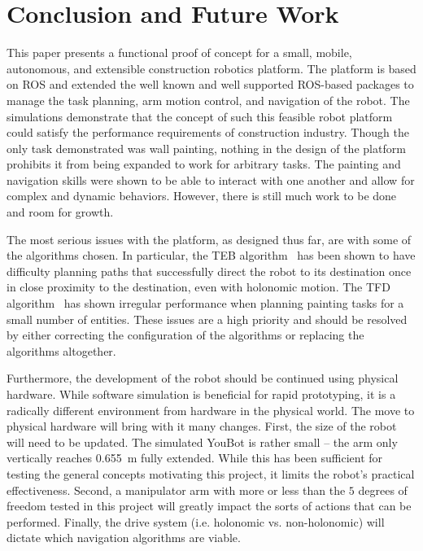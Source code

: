 \section{Conclusion and Future Work} \label{sec:conclusion}
This paper presents a functional proof of concept for a small, mobile, autonomous, and extensible construction robotics platform. The platform is based on ROS and extended the well known and well supported ROS-based packages to manage the task planning, arm motion control, and navigation of the robot. The simulations demonstrate that the concept of such this feasible robot platform could satisfy the performance requirements of construction industry. Though the only task demonstrated was wall painting, nothing in the design of the platform prohibits it from being expanded to work for arbitrary tasks. %
The painting and navigation skills were shown to be able to interact with one another and allow for complex and dynamic behaviors. However, there is still much work to be done and room for growth.

The most serious issues with the platform, as designed thus far, are with some of the algorithms chosen. In particular, the TEB algorithm~\cite{rosmann2012trajectory} has been shown to have difficulty planning paths that successfully direct the robot to its destination once in close proximity to the destination, even with holonomic motion. The TFD algorithm~\cite{eyerich2009using} has shown irregular performance when planning painting tasks for a small number of entities. These issues are a high priority and should be resolved by either correcting the configuration of the algorithms or replacing the algorithms altogether.

Furthermore, the development of the robot should be continued using physical hardware. While software simulation is beneficial for rapid prototyping, it is a radically different environment from hardware in the physical world. The move to physical hardware will bring with it many changes. First, the size of the robot will need to be updated. The simulated YouBot is rather small -- the arm only vertically reaches \SI{0.655}{\meter} fully extended. While this has been sufficient for testing the general concepts motivating this project, it limits the robot's practical effectiveness. Second, a manipulator arm with more or less than the $5$ degrees of freedom tested in this project will greatly impact the sorts of actions that can be performed. Finally, the drive system (i.e. holonomic vs. non-holonomic) will dictate which navigation algorithms are viable.

